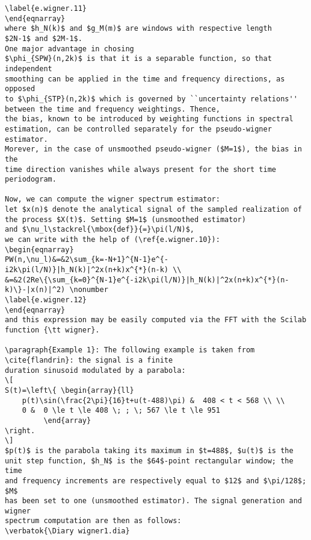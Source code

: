 {\begin{verbatim}
\label{e.wigner.11}
\end{eqnarray}
where $h_N(k)$ and $g_M(m)$ are windows with respective length 
$2N-1$ and $2M-1$.
One major advantage in chosing 
$\phi_{SPW}(n,2k)$ is that it is a separable function, so that independent 
smoothing can be applied in the time and frequency directions, as opposed 
to $\phi_{STP}(n,2k)$ which is governed by ``uncertainty relations'' 
between the time and frequency weightings. Thence, 
the bias, known to be introduced by weighting functions in spectral 
estimation, can be controlled separately for the pseudo-wigner estimator. 
Morever, in the case of unsmoothed pseudo-wigner ($M=1$), the bias in the 
time direction vanishes while always present for the short time periodogram. 

Now, we can compute the wigner spectrum estimator:
let $x(n)$ denote the analytical signal of the sampled realization of 
the process $X(t)$. Setting $M=1$ (unsmoothed estimator) 
and $\nu_l\stackrel{\mbox{def}}{=}\pi(l/N)$, 
we can write with the help of (\ref{e.wigner.10}): 
\begin{eqnarray}
PW(n,\nu_l)&=&2\sum_{k=-N+1}^{N-1}e^{-i2k\pi(l/N)}|h_N(k)|^2x(n+k)x^{*}(n-k) \\
&=&2(2Re\{\sum_{k=0}^{N-1}e^{-i2k\pi(l/N)}|h_N(k)|^2x(n+k)x^{*}(n-k)\}-|x(n)|^2) \nonumber
\label{e.wigner.12}
\end{eqnarray}
and this expression may be easily computed via the FFT with the Scilab 
function {\tt wigner}.

\paragraph{Example 1}: The following example is taken from \cite{flandrin}: the signal is a finite 
duration sinusoid modulated by a parabola:
\[
S(t)=\left\{ \begin{array}{ll}
	p(t)\sin(\frac{2\pi}{16}t+u(t-488)\pi) &  408 < t < 568 \\ \\
	0 &  0 \le t \le 408 \; ; \; 567 \le t \le 951
	     \end{array}
\right.
\]
$p(t)$ is the parabola taking its maximum in $t=488$, $u(t)$ is the 
unit step function, $h_N$ is the $64$-point rectangular window; the time 
and frequency increments are respectively equal to $12$ and $\pi/128$; $M$ 
has been set to one (unsmoothed estimator). The signal generation and wigner 
spectrum computation are then as follows:
\verbatok{\Diary wigner1.dia}
\end{verbatim}


}
